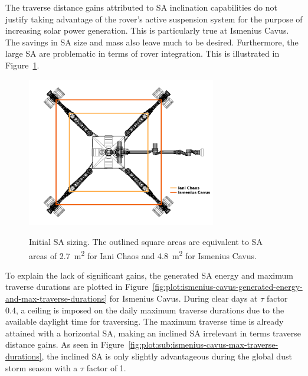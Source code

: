 \documentclass[twocolumn,letterpaper]{IEEEAerospaceCLS}  %
\newcommand{\refFig}[1]{{Figure}~\ref{#1}} %
\begin{document}
The traverse distance gains attributed to \ac{SA} inclination capabilities do not justify taking advantage of the rover's active suspension system for the purpose of increasing solar power generation. This is particularly true at Ismenius Cavus. The savings in \ac{SA} size and mass also leave much to be desired. Furthermore, the large \ac{SA} are problematic in terms of rover integration. This is illustrated in \refFig{fig:sa-area-initial-sizes}.

\begin{figure}[h]
  \centering
  \includegraphics[width=3.25in]{figures/images/sa-area-initial-sizes.png}\\
  \caption{Initial \ac{SA} sizing. The outlined square areas are equivalent to \ac{SA} areas of \SI{2.7}{m^{2}} for Iani Chaos and \SI{4.8}{m^{2}} for Ismenius Cavus.}
  \label{fig:sa-area-initial-sizes}
\end{figure}


To explain the lack of significant gains, the generated \ac{SA} energy and maximum traverse durations are plotted in \refFig{fig:plot:ismenius-cavus-generated-energy-and-max-traverse-durations} for Ismenius Cavus. During clear days at $\tau$ factor 0.4, a ceiling is imposed on the daily maximum traverse durations due to the available daylight time for traversing. The maximum traverse time is already attained with a horizontal \ac{SA}, making an inclined \ac{SA} irrelevant in terms traverse distance gains. As seen in \refFig{fig:plot:sub:ismenius-cavus-max-traverse-durations}, the inclined \ac{SA} is only slightly advantageous during the global dust storm season with a $\tau$ factor of 1.
\end{document}
